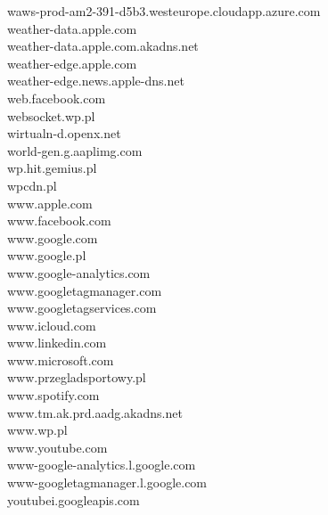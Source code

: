 \documentclass[12pt,a4paper]{article}
\begin{document}
\begin{scriptsize}
\begin{multicols}{3}
\begin{center}
                    waws-prod-am2-391-d5b3.westeurope.cloudapp.azure.com\\weather-data.apple.com\\weather-data.apple.com.akadns.net\\weather-edge.apple.com\\
                    weather-edge.news.apple-dns.net\\web.facebook.com\\websocket.wp.pl\\wirtualn-d.openx.net\\world-gen.g.aaplimg.com\\wp.hit.gemius.pl\\
                    wpcdn.pl\\www.apple.com\\www.facebook.com\\www.google.com\\www.google.pl\\www.google-analytics.com\\www.googletagmanager.com\\
                    www.googletagservices.com\\www.icloud.com\\www.linkedin.com\\www.microsoft.com\\www.przegladsportowy.pl\\www.spotify.com\\
                    www.tm.ak.prd.aadg.akadns.net\\www.wp.pl\\www.youtube.com\\www-google-analytics.l.google.com\\www-googletagmanager.l.google.com\\
                    youtubei.googleapis.com\\
                \end{center}
            \end{multicols}
        \end{scriptsize}
        \newpage
\end{document}
